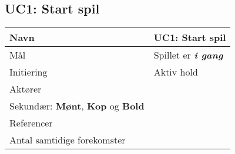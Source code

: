 \documentclass[Kravspecifikation/Kravspec_Main.tex]{subfiles}
\begin{document}
\subsection{UC1: Start spil}

\protect\hypertarget{t.982baa266913794041029567659e3677b1ccea8f}{}{}\protect\hypertarget{t.0}{}{}

\begin{longtable}[]{@{}ll@{}}
\toprule
\toprule
\endhead
\begin{minipage}[t]{0.47\columnwidth}\raggedright
{Navn}\strut
\end{minipage} & \begin{minipage}[t]{0.47\columnwidth}\raggedright
{UC1: Start spil}\strut
\end{minipage}\tabularnewline
\toprule
\begin{minipage}[t]{0.47\columnwidth}\raggedright
{Mål}\strut
\end{minipage} & \begin{minipage}[t]{0.47\columnwidth}\raggedright
{Spillet er \textit{\textbf{i gang}}}\strut
\end{minipage}\tabularnewline
\toprule
\begin{minipage}[t]{0.47\columnwidth}\raggedright
{Initiering}\strut
\end{minipage} & \begin{minipage}[t]{0.47\columnwidth}\raggedright
{Aktiv hold}\strut
\end{minipage}\tabularnewline
\toprule
\begin{minipage}[t]{0.47\columnwidth}\raggedright
{Aktører}\strut
\end{minipage} & \begin{minipage}[t]{0.47\columnwidth}\raggedright
{Primær: \textbf{Aktiv hold}\\Sekundær: \textbf{Mønt}, \textbf{Kop} og \textbf{Bold}}\strut
\end{minipage}\tabularnewline
\toprule
\begin{minipage}[t]{0.47\columnwidth}\raggedright
{Referencer}\strut
\end{minipage} & \begin{minipage}[t]{0.47\columnwidth}\raggedright
{}\strut
\end{minipage}\tabularnewline
\toprule
\begin{minipage}[t]{0.47\columnwidth}\raggedright
{Antal samtidige forekomster}\strut
\end{minipage} & \begin{minipage}[t]{0.47\columnwidth}\raggedright

\end{minipage}
\end{longtable}
\end{document}
